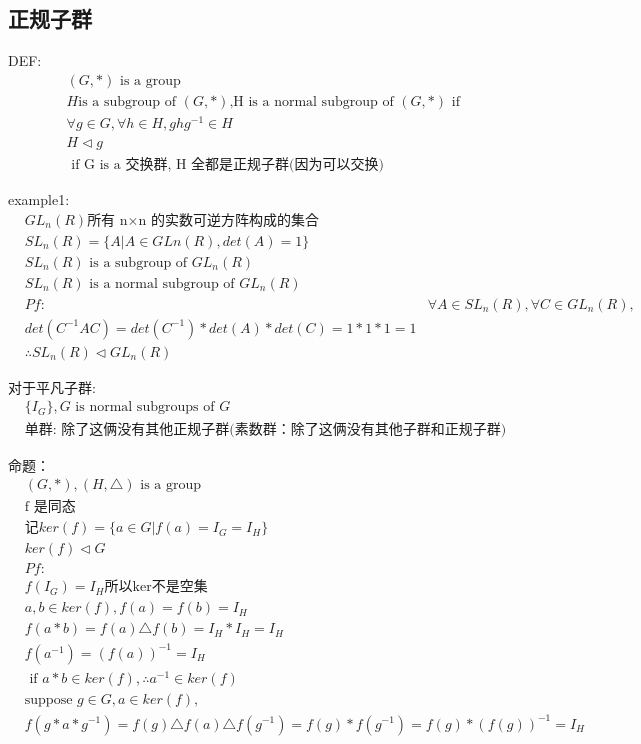 \documentclass[12pt, a4paper]{article}  %
\begin{document}
\subsection{正规子群}
DEF:
\begin{align}
    &(G,*)\text{ is a group}\\
    &H \text{is a subgroup of }(G,*)\text{,H is a normal subgroup of }(G,*)\text{ if }\\
    &\forall g\in G,\forall h \in H,ghg^{-1}\in H\\
    &H\lhd g\\
    &\text{ if G is a 交换群, H 全都是正规子群(因为可以交换)}
\end{align}

example1:
\begin{align}
    &GL_n(R)\text{所有 n×n 的实数可逆方阵构成的集合}\\
    &SL_n(R)=\{A|A\in GLn(R),det(A)=1\}\\
    &SL_n(R)\text{ is a subgroup of }GL_n(R)\\
    & SL_n(R)\text{ is a normal subgroup of }GL_n(R)\\
    & Pf:
    &\forall A\in SL_n(R),\forall C\in GL_n(R),\\
    &det(C^{-1}AC)=det(C^{-1})*det(A)*det(C)=1*1*1=1\\
    &\therefore SL_n(R)\lhd GL_n(R)
\end{align}

对于平凡子群:
\begin{align}
    &\{I_G\},G\text{ is normal subgroups of }G\\
    &\text{单群: 除了这俩没有其他正规子群(素数群：除了这俩没有其他子群和正规子群) }
\end{align}

命题：
\begin{align}
    &(G,*),(H,\triangle)\text{ is a group}\\
    &\text{f 是同态}\\
    &\text{记}ker(f)=\{a\in G|f(a)=I_G=I_H\}\\
    & ker(f) \lhd G
    &\\
    & Pf:\\
    & f(I_G)=I_H \text{所以ker不是空集}\\
    &a,b\in ker(f),f(a)=f(b)=I_H\\
    &f(a*b)=f(a)\triangle f(b)=I_H*I_H=I_H\\
    &f(a^{-1})=(f(a))^{-1}=I_H\\
    &\text{ if } a*b\in ker(f),\therefore a^{-1}\in ker(f)\\
    &\text{suppose }g\in G,a\in ker(f),\\
    &f(g*a*g^{-1})=f(g)\triangle f(a)\triangle f(g^{-1})=f(g)*f(g^{-1})=f(g)*(f(g))^{-1}=I_H
\end{align}
\end{document}
